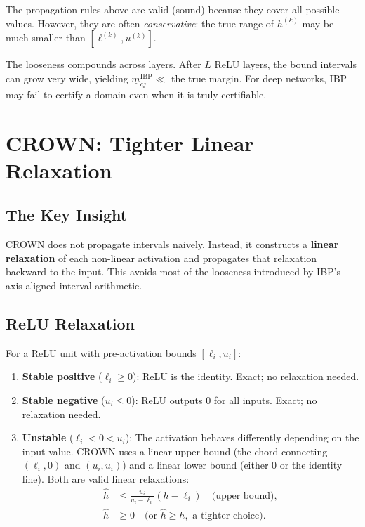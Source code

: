 \documentclass[11pt, a4paper]{article}
\theoremstyle{definition}
\theoremstyle{plain}
\newcommand{\mbm}[1]{\underline{m}_{#1}}
\begin{document}
The propagation rules above are valid (sound) because they cover all possible
values. However, they are often \emph{conservative}: the true range of $h^{(k)}$
may be much smaller than $[\ell^{(k)}, u^{(k)}]$.

The looseness compounds across layers. After $L$ ReLU layers, the bound intervals
can grow very wide, yielding $\mbm{cj}^{\text{IBP}} \ll$ the true margin.
For deep networks, IBP may fail to certify a domain even when it is truly certifiable.

\section{CROWN: Tighter Linear Relaxation}

\subsection{The Key Insight}

CROWN does not propagate intervals naively. Instead, it constructs a
\textbf{linear relaxation} of each non-linear activation and propagates
that relaxation backward to the input. This avoids most of the looseness
introduced by IBP's axis-aligned interval arithmetic.

\subsection{ReLU Relaxation}

For a ReLU unit with pre-activation bounds $[\ell_i, u_i]$:

\begin{enumerate}
  \item \textbf{Stable positive} ($\ell_i \ge 0$): ReLU is the identity.
        Exact; no relaxation needed.
  \item \textbf{Stable negative} ($u_i \le 0$): ReLU outputs 0 for all inputs.
        Exact; no relaxation needed.
  \item \textbf{Unstable} ($\ell_i < 0 < u_i$): The activation behaves
        differently depending on the input value. CROWN uses a linear upper bound
        (the chord connecting $(\ell_i, 0)$ and $(u_i, u_i)$) and a linear lower
        bound (either $0$ or the identity line). Both are valid linear relaxations:
        \begin{align}
          \hat{h} &\le \frac{u_i}{u_i - \ell_i}(h - \ell_i) \quad \text{(upper bound)}, \\
          \hat{h} &\ge 0 \quad \text{(or } \hat{h} \ge h, \text{ a tighter choice)}.
        \end{align}
\end{enumerate}
\end{document}
